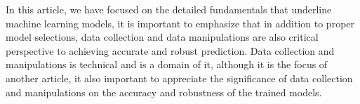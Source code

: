 
\par
In this article, we have focused on the detailed fundamentals that underline machine learning models, it is important to emphasize that in addition to proper model selections, data collection and data manipulations are also critical perspective to achieving accurate and robust prediction. Data collection and manipulations is technical and is a domain of it, although it is the focus of another article, it also important to appreciate the significance of data collection and manipulations on the accuracy and robustness of the trained models.
\par 
